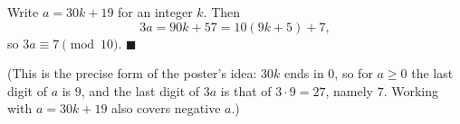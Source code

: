 Write $a=30k+19$ for an integer $k$. Then
\[3a=90k+57=10(9k+5)+7,\]
so $3a\equiv7\pmod{10}$. $\blacksquare$

(This is the precise form of the poster's idea: $30k$ ends in $0$, so for $a\ge0$ the last digit of $a$ is $9$, and the last digit of $3a$ is that of $3\cdot9=27$, namely $7$. Working with $a=30k+19$ also covers negative $a$.)
